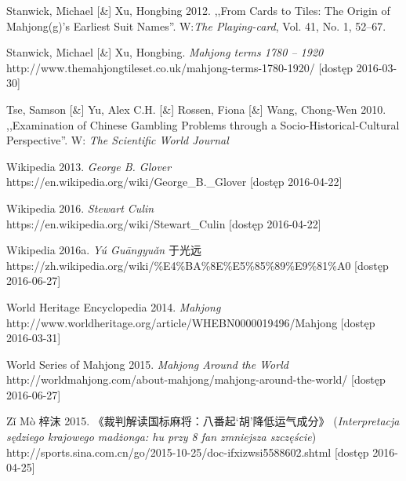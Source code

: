 Stanwick, Michael [\&] Xu, Hongbing 2012. ,,From Cards to Tiles: The Origin of
Mahjong(g)’s Earliest Suit Names''. W:\textit{The Playing-card}, Vol. 41, No. 1,
52–67.

Stanwick, Michael [\&] Xu, Hongbing. \textit{Mahjong terms 1780 – 1920}
\\http://www.themahjongtileset.co.uk/mahjong-terms-1780-1920/ [dostęp
2016-03-30]

Tse, Samson [\&] Yu, Alex C.H. [\&] Rossen, Fiona [\&] Wang, Chong-Wen
2010.
,,Examination of Chinese Gambling Problems through a Socio-Historical-Cultural Perspective''. W: \textit{The
Scientific World Journal}

Wikipedia 2013. \textit{George B. Glover}
\\https://en.wikipedia.org/wiki/George\_B.\_Glover [dostęp 2016-04-22]

Wikipedia 2016. \textit{Stewart Culin}
\\https://en.wikipedia.org/wiki/Stewart\_Culin [dostęp 2016-04-22]

Wikipedia 2016a. \textit{Yú Guāngyuǎn} 于光远
\\https://zh.wikipedia.org/wiki/\%E4\%BA\%8E\%E5\%85\%89\%E9\%81\%A0 [dostęp
2016-06-27]

World Heritage Encyclopedia 2014. \textit{Mahjong}
\\http://www.worldheritage.org/article/WHEBN0000019496/Mahjong [dostęp
2016-03-31]

World Series of Mahjong 2015. \textit{Mahjong Around the World}
\\http://worldmahjong.com/about-mahjong/mahjong-around-the-world/ [dostęp
2016-06-27]

Zǐ Mò 梓沫 2015. 《裁判解读国标麻将：八番起‘胡’降低运气成分》
(\textit{Interpretacja sędziego krajowego madżonga:
hu przy 8 fan zmniejsza szczęście}) %
\\http://sports.sina.com.cn/go/2015-10-25/doc-ifxizwsi5588602.shtml [dostęp 2016-04-25]



